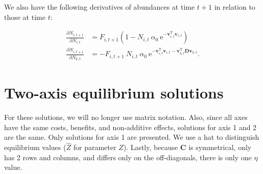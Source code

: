 We also have the following derivatives of abundances at time $t+1$ in relation
to those at time $t$:

\begin{equation*}
\begin{split}
    \frac{ \partial N_{i,t+1} }{ \partial N_{i,t} } &= 
        F_{i,t+1}
        \left(
            1 - N_{i,t} \: \alpha_0 \: 
            \text{e}^{ -\mathbf{v}_{i,t}^{\text{T}} \mathbf{v}_{i,t} } 
        \right) \\
    \frac{ \partial N_{i,t+1} }{ \partial N_{k,t} } &= 
        - F_{i,t+1} \: N_{i,t} \: \alpha_0 \: 
        \text{e}^{ -\mathbf{v}_{i,t}^{\text{T}} \mathbf{v}_{i,t} -
            \mathbf{v}_{k,t}^{\text{T}} \mathbf{D} \mathbf{v}_{k,t} } 
    \textrm{.}
\end{split}
\end{equation*}

















\section*{Two-axis equilibrium solutions}

For these solutions, we will no longer use matrix notation.
Also, since all axes have the same costs, benefits, and
non-additive effects, solutions for axis 1 and 2 are the same.
Only solutions for axis 1 are presented.
We use a hat to distinguish equilibrium values
($\hat{Z}$ for parameter $Z$).
Lastly, because $\mathbf{C}$ is symmetrical, only has 2 rows and columns, and
differs only on the off-diagonals, there is only one $\eta$ value.


